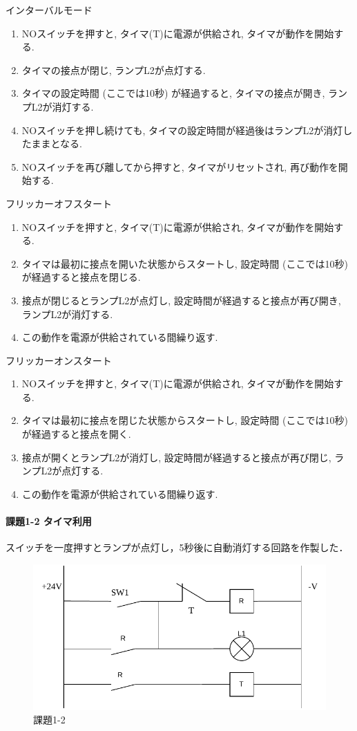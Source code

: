 インターバルモード
\begin{enumerate}
  \item NOスイッチを押すと, タイマ(T)に電源が供給され, タイマが動作を開始する.
  \item タイマの接点が閉じ, ランプL2が点灯する.
  \item タイマの設定時間 (ここでは10秒) が経過すると, タイマの接点が開き, ランプL2が消灯する.
  \item NOスイッチを押し続けても, タイマの設定時間が経過後はランプL2が消灯したままとなる.
  \item NOスイッチを再び離してから押すと, タイマがリセットされ, 再び動作を開始する.
\end{enumerate}

フリッカーオフスタート
\begin{enumerate}
  \item NOスイッチを押すと, タイマ(T)に電源が供給され, タイマが動作を開始する.
  \item タイマは最初に接点を開いた状態からスタートし, 設定時間 (ここでは10秒) が経過すると接点を閉じる.
  \item 接点が閉じるとランプL2が点灯し, 設定時間が経過すると接点が再び開き, ランプL2が消灯する.
  \item この動作を電源が供給されている間繰り返す.
\end{enumerate}

フリッカーオンスタート
\begin{enumerate}
  \item NOスイッチを押すと, タイマ(T)に電源が供給され, タイマが動作を開始する.
  \item タイマは最初に接点を閉じた状態からスタートし, 設定時間 (ここでは10秒) が経過すると接点を開く.
  \item 接点が開くとランプL2が消灯し, 設定時間が経過すると接点が再び閉じ, ランプL2が点灯する.
  \item この動作を電源が供給されている間繰り返す.
\end{enumerate}


\paragraph{課題1-2 タイマ利用}
スイッチを一度押すとランプが点灯し，5秒後に自動消灯する回路を作製した．
\begin{figure}[H]
  \centering
  \includegraphics[scale=0.5]{sozai/15.pdf}
  \caption{課題1-2}
\end{figure}

